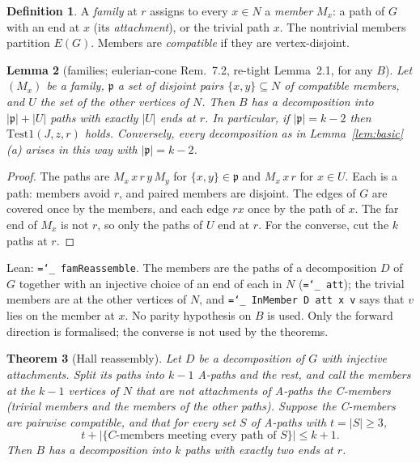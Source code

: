 \documentclass[11pt]{amsart}
\newtheorem{theorem}{Theorem}[section]
\newtheorem{lemma}[theorem]{Lemma}
\theoremstyle{definition}
\newtheorem{definition}[theorem]{Definition}
\newcommand{\lean}[1]{\texttt{\hyphenchar\font=`\_ #1}}
\begin{document}
\begin{definition}
A \emph{family} at $r$ assigns to every $x\in N$ a \emph{member} $M_x$: a path of $G$ with an end at
$x$ (its \emph{attachment}), or the trivial path $x$. The nontrivial members partition $E(G)$. Members
are \emph{compatible} if they are vertex-disjoint.
\end{definition}

\begin{lemma}[families; eulerian-cone Rem.~7.2, re-tight Lemma~2.1, for any $B$]\label{lem:fam}
Let $(M_x)$ be a family, $\mathfrak p$ a set of disjoint pairs $\{x,y\}\subseteq N$ of compatible
members, and $U$ the set of the other vertices of $N$. Then $B$ has a decomposition into
$|\mathfrak p|+|U|$ paths with exactly $|U|$ ends at $r$. In particular, if $|\mathfrak p|=k-2$
then $\mathrm{Test1}(J,z,r)$ holds. Conversely, every decomposition as in Lemma~\ref{lem:basic}(a)
arises in this way with $|\mathfrak p|=k-2$.
\end{lemma}

\begin{proof}
The paths are $M_x\,x\,r\,y\,M_y$ for $\{x,y\}\in\mathfrak p$ and $M_x\,x\,r$ for $x\in U$. Each is a
path: members avoid $r$, and paired members are disjoint. The edges of $G$ are covered once by the
members, and each edge $rx$ once by the path of $x$. The far end of $M_x$ is not $r$, so only the
paths of $U$ end at $r$. For the converse, cut the $k$ paths at $r$.
\end{proof}

Lean: \lean{famReassemble}. The members are the paths of a decomposition $D$ of $G$ together with an
injective choice of an end of each in $N$ (\lean{att}); the trivial members are at the other vertices
of $N$, and \lean{InMember D att x v} says that $v$ lies on the member at $x$. No parity hypothesis
on $B$ is used. Only the forward direction is formalised; the converse is not used by the theorems.

\begin{theorem}[Hall reassembly]\label{thm:hall}
Let $D$ be a decomposition of $G$ with injective attachments. Split its paths into $k-1$
\emph{A-paths} and the rest, and call the members at the $k-1$ vertices of $N$ that are not
attachments of A-paths the \emph{C-members} (trivial members and the members of the other paths).
Suppose the C-members are pairwise compatible, and that for every set $S$ of A-paths with
$t=|S|\ge3$,
\[
t+\bigl|\{C\text{-members meeting every path of }S\}\bigr|\le k+1 .
\]
Then $B$ has a decomposition into $k$ paths with exactly two ends at $r$.
\end{theorem}
\end{document}
